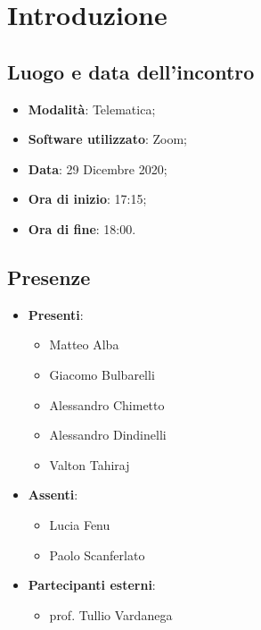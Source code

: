 \documentclass[]{article}
\begin{document}
	
	
	
	\newpage
	
	
	\section{Introduzione}
		\subsection{Luogo e data dell'incontro}
		\begin{itemize}
			\item \textbf{Modalità}: Telematica;
			\item \textbf{Software utilizzato}: Zoom;
			\item \textbf{Data}: 29 Dicembre 2020;
			\item \textbf{Ora di inizio}: 17:15;
			\item \textbf{Ora di fine}: 18:00.
		\end{itemize}
		
		\subsection{Presenze}
		\begin{itemize}
			\item \textbf{Presenti}: 
			\begin{itemize}
				\item Matteo Alba
				\item Giacomo Bulbarelli
				\item Alessandro Chimetto
				\item Alessandro Dindinelli
				\item Valton Tahiraj
			\end{itemize}
			\item \textbf{Assenti}:
			\begin{itemize}
				\item Lucia Fenu
				\item Paolo Scanferlato
			\end{itemize}
			\item \textbf{Partecipanti esterni}:
			\begin{itemize}
				\item prof. Tullio Vardanega
			\end{itemize}	
		\end{itemize}
		
\end{document}
